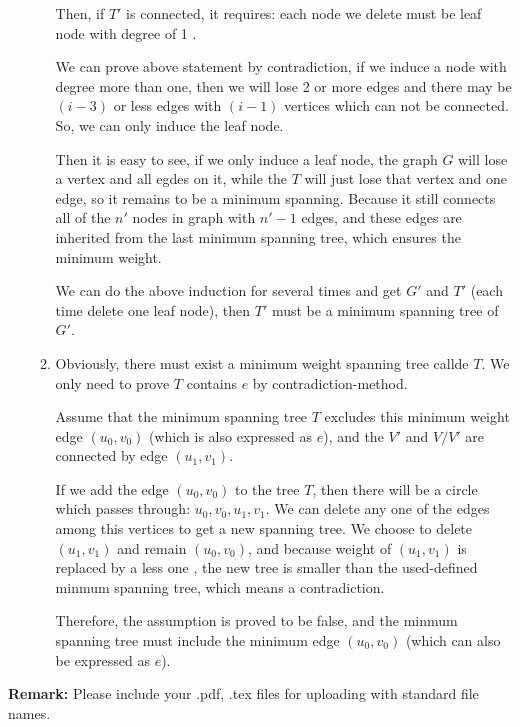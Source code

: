 \documentclass[12pt,a4paper]{article}
\theoremstyle{definition}
\begin{document}
\begin{enumerate}
\begin{enumerate}
		Then, if $T'$ is connected, it requires: each node we delete must be leaf node with degree of 1 .
		
		We can prove above statement by contradiction, if we induce a node with degree more than one, then we will lose 2 or more edges and there may be $(i-3)$ or less edges  with $(i-1)$ vertices which can not be connected. So, we can only induce the leaf node.
		
		Then it is easy to see, if we only induce a leaf node, the graph $G$ will lose a vertex and all egdes on it, while the $T$ will just lose that vertex and one edge, so it remains to be a minimum spanning. Because it still connects  all of the $n'$ nodes in graph with $n'-1$ edges, and these edges are inherited from the last minimum spanning tree, which ensures the minimum weight.
				
		We can do the above induction for several times and get $G'$ and $T'$ (each time delete one leaf node), then $T'$ must be a minimum spanning tree of $G'$.
		
	   \item Obviously, there must exist a minimum weight spanning tree callde $T$. We only need to prove $T$ contains $e$  by contradiction-method.
	   
	   Assume that the minimum spanning tree $T$ excludes this minimum weight edge $(u_0,v_0)$ (which is also expressed as $e$), and the $V'$ and $V/ V'$ are connected by  edge $(u_1,v_1)$. 
	   
	   If we add the edge $(u_0,v_0)$ to the tree $T$, then there will be a circle which passes through: $ u_0,v_0,u_1,v_1$. We can delete any one of the edges among this vertices to get a new spanning tree. We choose to delete $(u_1,v_1)$ and remain $(u_0,v_0) $, and  because weight of $(u_1,v_1)$ is replaced by a less one , the new tree is smaller than the used-defined minmum spanning tree, which means a contradiction.
	   
	   Therefore, the assumption is proved to be false, and the minmum spanning tree must include the minimum edge $(u_0,v_0)$ (which can also be expressed as $e$).
	    
		
	\end{enumerate}
\end{enumerate}



\textbf{Remark:} Please include your .pdf, .tex files for uploading with standard file names.


\end{document}
